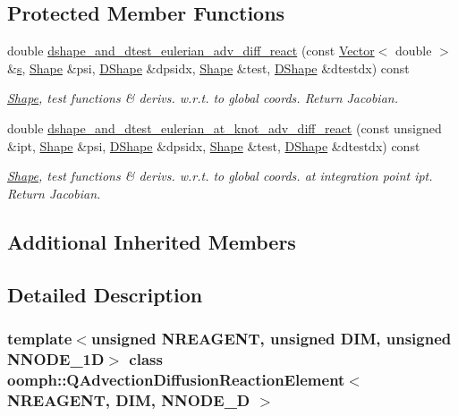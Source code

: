 \subsection*{Protected Member Functions}
\begin{DoxyCompactItemize}
\item 
double \hyperlink{classoomph_1_1QAdvectionDiffusionReactionElement_acb2af6c72ae97ffe0c762c9df692c3ab}{dshape\+\_\+and\+\_\+dtest\+\_\+eulerian\+\_\+adv\+\_\+diff\+\_\+react} (const \hyperlink{classoomph_1_1Vector}{Vector}$<$ double $>$ \&\hyperlink{cfortran_8h_ab7123126e4885ef647dd9c6e3807a21c}{s}, \hyperlink{classoomph_1_1Shape}{Shape} \&psi, \hyperlink{classoomph_1_1DShape}{D\+Shape} \&dpsidx, \hyperlink{classoomph_1_1Shape}{Shape} \&test, \hyperlink{classoomph_1_1DShape}{D\+Shape} \&dtestdx) const
\begin{DoxyCompactList}\small\item\em \hyperlink{classoomph_1_1Shape}{Shape}, test functions \& derivs. w.\+r.\+t. to global coords. Return Jacobian. \end{DoxyCompactList}\item 
double \hyperlink{classoomph_1_1QAdvectionDiffusionReactionElement_a2a52a7accae36bd8e3bb46e659f9c983}{dshape\+\_\+and\+\_\+dtest\+\_\+eulerian\+\_\+at\+\_\+knot\+\_\+adv\+\_\+diff\+\_\+react} (const unsigned \&ipt, \hyperlink{classoomph_1_1Shape}{Shape} \&psi, \hyperlink{classoomph_1_1DShape}{D\+Shape} \&dpsidx, \hyperlink{classoomph_1_1Shape}{Shape} \&test, \hyperlink{classoomph_1_1DShape}{D\+Shape} \&dtestdx) const
\begin{DoxyCompactList}\small\item\em \hyperlink{classoomph_1_1Shape}{Shape}, test functions \& derivs. w.\+r.\+t. to global coords. at integration point ipt. Return Jacobian. \end{DoxyCompactList}\end{DoxyCompactItemize}
\subsection*{Additional Inherited Members}


\subsection{Detailed Description}
\subsubsection*{template$<$unsigned N\+R\+E\+A\+G\+E\+NT, unsigned D\+IM, unsigned N\+N\+O\+D\+E\+\_\+1D$>$\newline
class oomph\+::\+Q\+Advection\+Diffusion\+Reaction\+Element$<$ N\+R\+E\+A\+G\+E\+N\+T, D\+I\+M, N\+N\+O\+D\+E\+\_\+D $>$}

